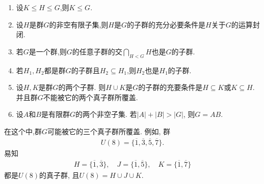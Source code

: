 \documentclass[../../main.tex]{subfiles}%
\begin{document}
\begin{proposition}\label{proposition:抽象代数---子群的基本性质}
\begin{enumerate}[(1)]
\item\label{proposition:抽象代数---子群的基本性质-0} 设$K\leqslant H\leqslant G$,则$K\leqslant G$.

\item\label{proposition:抽象代数---子群的基本性质-1} 设$H$是群$G$的非空有限子集,则$H$是$G$的子群的充分必要条件是$H$关于$G$的运算封闭.

\item\label{proposition:抽象代数---子群的基本性质-2} 若$G$是一个群,则$G$的任意子群的交$\bigcap_{H<G}{H}$也是$G$的子群.

\item\label{proposition:抽象代数---子群的基本性质-3} 若$H_1,H_2$都是群$G$的子群且$H_2\subseteq H_1$,则$H_2$也是$H_1$的子群.

\item\label{proposition:抽象代数---子群的基本性质-4} 设$H,K$是群$G$的两个子群. 则$H\cup K$是$G$的子群的充要条件是$H\subseteq K$或$K\subseteq H$. 并且群$G$不能被它的两个真子群所覆盖.

\item\label{proposition:抽象代数---子群的基本性质-5} 设$A$和$B$是有限群$G$的两个非空子集. 若$|A|+|B|>|G|$, 则$G=AB$.
\end{enumerate}
\end{proposition}
\begin{remark}
在这个中,群$G$可能被它的三个真子群所覆盖. 例如, 群
\begin{align*}
U(8)=\{\overline{1},\overline{3},\overline{5},\overline{7}\}.
\end{align*}
易知
\begin{align*}
H=\{\overline{1},\overline{3}\}, \quad J=\{\overline{1},\overline{5}\}, \quad K=\{\overline{1},\overline{7}\}
\end{align*}
都是$U(8)$的真子群, 且$U(8)=H\cup J\cup K$.
\end{remark}
\end{document}
